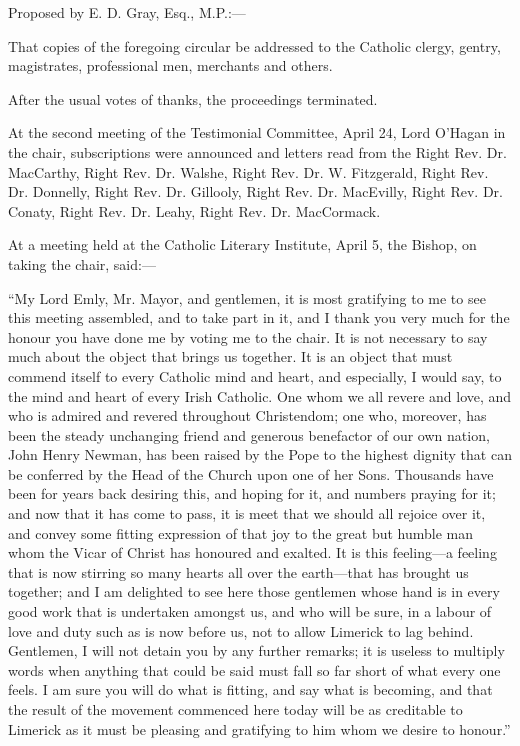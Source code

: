 Proposed by E. D. Gray, Esq., M.P.:—

That copies of the foregoing circular be addressed to the Catholic
clergy, gentry, magistrates, professional men, merchants and others.

After the usual votes of thanks, the proceedings terminated.

At the second meeting of the Testimonial Committee, April 24, Lord
O'Hagan in the chair, subscriptions were announced and letters read
from the Right Rev. Dr. MacCarthy, Right Rev. Dr. Walshe, Right Rev.
Dr. W. Fitzgerald, Right Rev. Dr. Donnelly, Right Rev. Dr. Gillooly,
Right Rev. Dr. MacEvilly, Right Rev. Dr. Conaty, Right Rev. Dr. Leahy,
Right Rev. Dr. MacCormack.



At a meeting held at the Catholic Literary Institute, April 5, the
Bishop, on taking the chair, said:—

``My Lord Emly, Mr. Mayor, and gentlemen, it is most gratifying
to me to see this meeting assembled, and to take part in it, and I
thank you very much for the honour you have done me by voting me to
the chair. It is not necessary to say much about the object that
brings us together. It is an object that must commend itself to every
Catholic mind and heart, and especially, I would say, to the mind and
heart of every Irish Catholic. One whom we all revere and love, and
who is admired and revered throughout Christendom; one who, moreover,
has been the steady unchanging friend and generous benefactor of our
own nation, John Henry Newman, has been raised by the Pope to the
highest dignity that can be conferred by the Head of the Church
upon one of her Sons. Thousands have been for years back desiring
this, and hoping for it, and numbers praying for it; and now that it
has come to pass, it is meet that we should all rejoice over it, and
convey some fitting expression of that joy to the great but humble man
whom the Vicar of Christ has honoured and exalted. It is this feeling—a
feeling that is now stirring so many hearts all over the earth—that
has brought us together; and I am delighted to see here those
gentlemen whose hand is in every good work that is undertaken amongst
us, and who will be sure, in a labour of love and duty such as is now
before us, not to allow Limerick to lag behind. Gentlemen, I will not
detain you by any further remarks; it is useless to multiply words
when anything that could be said must fall so far short of what every
one feels. I am sure you will do what is fitting, and say what is
becoming, and that the result of the movement commenced here today
will be as creditable to Limerick as it must be pleasing and
gratifying to him whom we desire to honour.''

